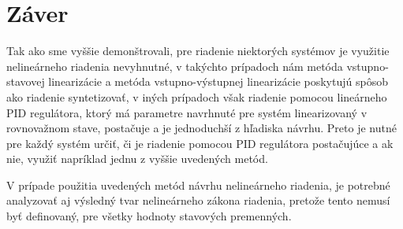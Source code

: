 \newpage
{}
{
	\section{Záver}
    Tak ako sme vyššie demonštrovali, pre riadenie niektorých systémov je využitie nelineárneho riadenia nevyhnutné, v takýchto prípadoch nám metóda vstupno-stavovej linearizácie a metóda vstupno-výstupnej linearizácie poskytujú spôsob ako riadenie syntetizovať, v iných prípadoch však riadenie pomocou lineárneho PID regulátora, ktorý má parametre navrhnuté pre systém linearizovaný v rovnovažnom stave, postačuje a je jednoduchší z hľadiska návrhu. Preto je nutné pre každý systém určiť, či je riadenie pomocou PID regulátora postačujúce a ak nie, využiť napríklad jednu z vyššie uvedených metód.

    V prípade použitia uvedených metód návrhu nelineárneho riadenia, je potrebné analyzovať aj výsledný tvar nelineárneho zákona riadenia, pretože tento nemusí byť definovaný, pre všetky hodnoty stavových premenných.

}

